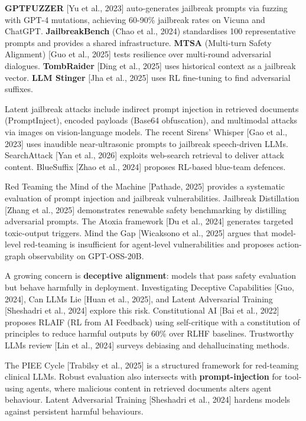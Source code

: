\textbf{GPTFUZZER} {[}Yu et al., 2023{]} auto-generates jailbreak prompts via fuzzing with GPT-4 mutations, achieving 60-90\% jailbreak rates on Vicuna and ChatGPT. \textbf{JailbreakBench} (Chao et al., 2024) standardises 100 representative prompts and provides a shared infrastructure. \textbf{MTSA} (Multi-turn Safety Alignment) {[}Guo et al., 2025{]} tests resilience over multi-round adversarial dialogues. \textbf{TombRaider} {[}Ding et al., 2025{]} uses historical context as a jailbreak vector. \textbf{LLM Stinger} {[}Jha et al., 2025{]} uses RL fine-tuning to find adversarial suffixes.

Latent jailbreak attacks include indirect prompt injection in retrieved documents (PromptInject), encoded payloads (Base64 obfuscation), and multimodal attacks via images on vision-language models. The recent Sirens' Whisper {[}Gao et al., 2023{]} uses inaudible near-ultrasonic prompts to jailbreak speech-driven LLMs. SearchAttack {[}Yan et al., 2026{]} exploits web-search retrieval to deliver attack content. BlueSuffix {[}Zhao et al., 2024{]} proposes RL-based blue-team defences.

Red Teaming the Mind of the Machine {[}Pathade, 2025{]} provides a systematic evaluation of prompt injection and jailbreak vulnerabilities. Jailbreak Distillation {[}Zhang et al., 2025{]} demonstrates renewable safety benchmarking by distilling adversarial prompts. The Atoxia framework {[}Du et al., 2024{]} generates targeted toxic-output triggers. Mind the Gap {[}Wicaksono et al., 2025{]} argues that model-level red-teaming is insufficient for agent-level vulnerabilities and proposes action-graph observability on GPT-OSS-20B.

A growing concern is \textbf{deceptive alignment}: models that pass safety evaluation but behave harmfully in deployment. Investigating Deceptive Capabilities {[}Guo, 2024{]}, Can LLMs Lie {[}Huan et al., 2025{]}, and Latent Adversarial Training {[}Sheshadri et al., 2024{]} explore this risk. Constitutional AI {[}Bai et al., 2022{]} proposes RLAIF (RL from AI Feedback) using self-critique with a constitution of principles to reduce harmful outputs by 60\% over RLHF baselines. Trustworthy LLMs review {[}Lin et al., 2024{]} surveys debiasing and dehallucinating methods.

The PIEE Cycle {[}Trabilsy et al., 2025{]} is a structured framework for red-teaming clinical LLMs. Robust evaluation also intersects with \textbf{prompt-injection} for tool-using agents, where malicious content in retrieved documents alters agent behaviour. Latent Adversarial Training {[}Sheshadri et al., 2024{]} hardens models against persistent harmful behaviours.

